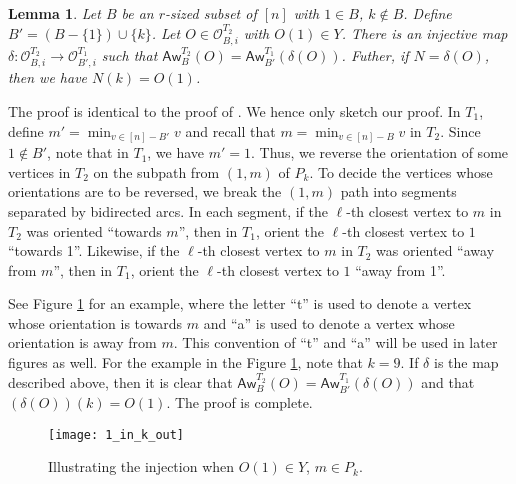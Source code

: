 \documentclass[12pt]{article}
\def\eod{\vrule height 6pt width 5pt depth 0pt}
\newenvironment{proof}{\noindent {\bf Proof:} \hspace{.2em}}
                      {\hspace*{\fill}{\eod}}
\newtheorem{lemma}[theorem]{Lemma}
\newcommand{\sO}{  \mathcal{ O}}
\newcommand{\awy}{\mathsf{Aw}}
\begin{document}
\begin{lemma}
\label{lem:mapping_B_to_B'}
Let $B$ be an $r$-sized subset of $[n]$ with $1 \in B$, $k \not \in B$.  Define
$B' = (B - \{1\}) \cup \{k\}$.  Let $O \in \sO_{B,i}^{T_2}$
with $O(1) \in Y$.  There is an injective map $\delta: \sO_{B,i}^{T_2} 
\rightarrow \sO_{B',i}^{T_1}$ such that 
$\awy_B^{T_2}(O) = \awy_{B'}^{T_1}(\delta(O))$.  Futher, if
$N = \delta(O)$, then we have $N(k) = O(1)$.
\end{lemma}
\begin{proof}
The proof is identical to the proof of \cite[Lemma 7]{mukesh-siva-hook}.  We hence
only sketch our proof.  In $T_1$, define
$m' = \min_{v \in [n] - B'}v$ and recall that
$m = \min_{v \in [n] - B}v$ in $T_2$.
Since $1 \not \in B'$, note that in $T_1$, we have $m'=1$.  
Thus, we
reverse the orientation of some vertices in $T_2$ on the subpath 
from $(1,m)$ of $P_k$.  To 
decide the vertices whose orientations are to be reversed, we break the $(1,m)$ path
into segments separated by bidirected arcs. 
In each segment, 
if the $\ell$-th closest vertex to $m$ in $T_2$ was oriented ``towards $m$'', then 
in $T_1$, orient the $\ell$-th closest vertex to $1$ ``towards 1''.  Likewise, 
if the $\ell$-th closest vertex to $m$ in $T_2$ was oriented ``away from $m$'', 
then in $T_1$, orient the $\ell$-th closest vertex to $1$ ``away from 1''.

See Figure \ref{fig:case0} for an example, where the letter
``t'' is used to denote a vertex whose orientation is towards $m$ and
``a'' is used to denote a vertex whose orientation is away from $m$.  
This convention of ``t'' and ``a'' will be used in later figures as well.
For the example in the Figure \ref{fig:case0}, note that $k = 9$.
If $\delta$ is the map described above,
then it is clear that $\awy_B^{T_2}(O) = \awy_{B'}^{T_1}(\delta(O))$ and 
that $(\delta(O))(k) = O(1)$.
The proof is complete.
\end{proof}


\begin{figure}[h]
\centerline{\texttt{[image: 1\_in\_k\_out]}}
\caption{Illustrating the injection when $O(1) \in Y$, $m \in P_k$.}
\label{fig:case0} 
\end{figure}
\end{document}

